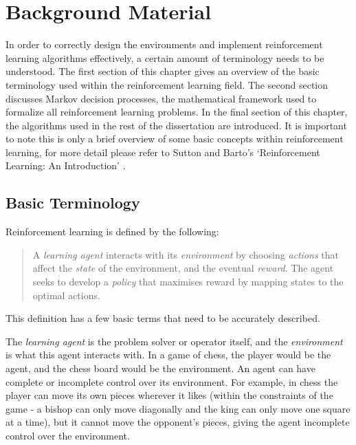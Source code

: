 \chapter{Background Material}

In order to correctly design the environments and implement reinforcement learning algorithms effectively, a certain amount of terminology needs to be understood. The first section of this chapter gives an overview of the basic terminology used within the reinforcement learning field. The second section discusses Markov decision processes, the mathematical framework used to formalize all reinforcement learning problems. In the final section of this chapter, the algorithms used in the rest of the dissertation are introduced. It is important to note this is only a brief overview of some basic concepts within reinforcement learning, for more detail please refer to Sutton and Barto's `Reinforcement Learning: An Introduction' \cite{Sutton:RLIntro01}.

\section{Basic Terminology}
Reinforcement learning is defined by the following:
\begin{quote}
A \textit{learning agent} interacts with its \textit{environment} by choosing \textit{actions} that affect the \textit{state} of the environment, and the eventual \textit{reward}. The agent seeks to develop a \textit{policy} that maximises reward by mapping states to the optimal actions.
\end{quote}
This definition has a few basic terms that need to be accurately described.

The \textit{learning agent} is the problem solver or operator itself, and the \textit{environment} is what this agent interacts with. In a game of chess, the player would be the agent, and the chess board would be the environment. An agent can have complete or incomplete control over its environment. For example, in chess the player can move its own pieces wherever it likes (within the constraints of the game - a bishop can only move diagonally and the king can only move one square at a time), but it cannot move the opponent's pieces, giving the agent incomplete control over the environment.

